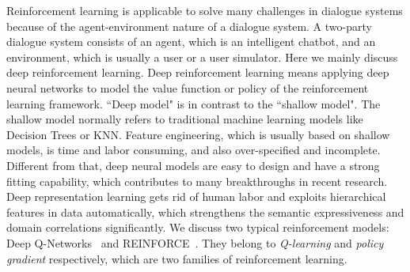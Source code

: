 Reinforcement learning is applicable to solve many challenges in dialogue systems because of the agent-environment nature of a dialogue system. A two-party dialogue system consists of an agent, which is an intelligent chatbot, and an environment, which is usually a user or a user simulator. Here we mainly discuss deep reinforcement learning. 
Deep reinforcement learning means applying deep neural networks to model the value function or policy of the reinforcement learning framework. ``Deep model" is in contrast to the ``shallow model". The shallow model normally refers to traditional machine learning models like Decision Trees or KNN. Feature engineering, which is usually based on shallow models, is time and labor consuming, and also over-specified and incomplete. Different from that, deep neural models are easy to design and have a strong fitting capability, which contributes to many breakthroughs in recent research. Deep representation learning gets rid of human labor and exploits hierarchical features in data automatically, which strengthens the semantic expressiveness and domain correlations significantly. 
We discuss two typical reinforcement models: Deep Q-Networks~ and REINFORCE~. They belong to \textit{Q-learning} and \textit{policy gradient} respectively, which are two families of reinforcement learning.

